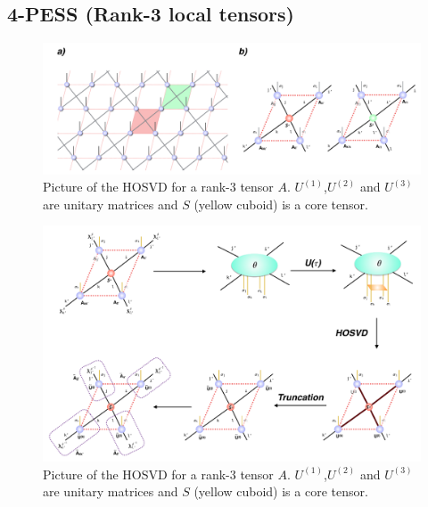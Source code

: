 \subsection{4-PESS (Rank-3 local tensors)}
\label{4pess2b}
\begin{figure}[ht]
	\centering
	\includegraphics[width=1.00\textwidth]{figures/fig4325.png}
	\caption[The picture of the HOSVD for a rank-3 tensor.]{Picture of the HOSVD for a rank-3 tensor $A$. $U^{(1)}$,$U^{(2)}$ and $U^{(3)}$ are unitary matrices and $S$ (yellow cuboid) is a core tensor.}
	\label{fig4325}
\end{figure}
\begin{figure}[ht]
	\centering
	\includegraphics[width=1.00\textwidth]{figures/fig4326.png}
	\caption[The picture of the HOSVD for a rank-3 tensor.]{Picture of the HOSVD for a rank-3 tensor $A$. $U^{(1)}$,$U^{(2)}$ and $U^{(3)}$ are unitary matrices and $S$ (yellow cuboid) is a core tensor.}
	\label{fig4326}
\end{figure}
